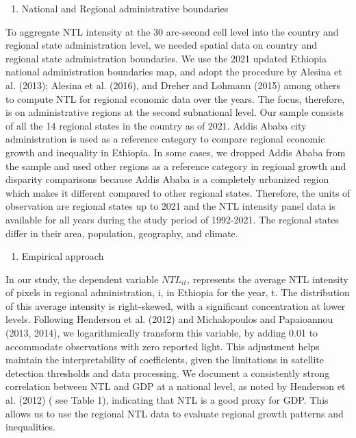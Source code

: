\begin{enumerate}
\def\labelenumi{\arabic{enumi}.}
\setcounter{enumi}{3}
\item
  National and Regional administrative boundaries
\end{enumerate}

To aggregate NTL intensity at the 30 arc-second cell level into the
country and regional state administration level, we needed spatial data
on country and regional state administration boundaries. We use the 2021
updated Ethiopia national administration boundaries map, and adopt the
procedure by Alesina et al. (2013); Alesina et al. (2016), and Dreher
and Lohmann (2015) among others to compute NTL for regional economic
data over the years. The focus, therefore, is on administrative regions
at the second subnational level. Our sample consists of all the 14
regional states in the country as of 2021. Addis Ababa city
administration is used as a reference category to compare regional
economic growth and inequality in Ethiopia. In some cases, we dropped
Addis Ababa from the sample and used other regions as a reference
category in regional growth and disparity comparisons because Addis
Ababa is a completely urbanized region which makes it different compared
to other regional states. Therefore, the units of observation are
regional states up to 2021 and the NTL intensity panel data is available
for all years during the study period of 1992-2021. The regional states
differ in their area, population, geography, and climate.

\begin{enumerate}
\def\labelenumi{\arabic{enumi}.}
\setcounter{enumi}{1}
\item
  Empirical approach
\end{enumerate}

In our study, the dependent variable \({NTL}_{it}\)\emph{,} \hspace{0pt}
represents the average NTL intensity of pixels in regional
administration, i, in Ethiopia for the year, t. The distribution of this
average intensity is right-skewed, with a significant concentration at
lower levels. Following Henderson et al. (2012) and Michalopoulos and
Papaioannou (2013, 2014), we logarithmically transform this variable, by
adding 0.01 to accommodate observations with zero reported light. This
adjustment helps maintain the interpretability of coefficients, given
the limitations in satellite detection thresholds and data processing.
We document a consistently strong correlation between NTL and GDP at a
national level, as noted by Henderson et al. (2012) ( see Table 1),
indicating that NTL is a good proxy for GDP. This allows us to use the
regional NTL data to evaluate regional growth patterns and inequalities.

